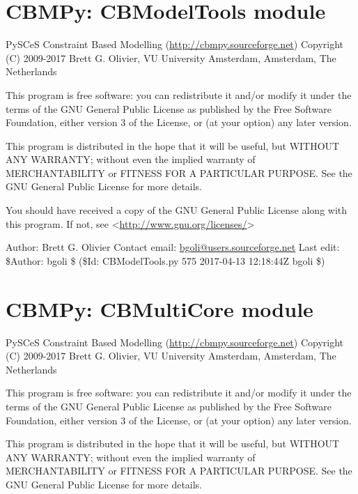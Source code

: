 \documentclass[a4paper,11pt,english]{sphinxmanual}
\begin{document}
\label{modules_doc:module-cbmpy.CBModelTools}

\section{CBMPy: CBModelTools module}
\label{modules_doc:cbmpy-cbmodeltools-module}
PySCeS Constraint Based Modelling (\url{http://cbmpy.sourceforge.net})
Copyright (C) 2009-2017 Brett G. Olivier, VU University Amsterdam, Amsterdam, The Netherlands

This program is free software: you can redistribute it and/or modify
it under the terms of the GNU General Public License as published by
the Free Software Foundation, either version 3 of the License, or
(at your option) any later version.

This program is distributed in the hope that it will be useful,
but WITHOUT ANY WARRANTY; without even the implied warranty of
MERCHANTABILITY or FITNESS FOR A PARTICULAR PURPOSE.  See the
GNU General Public License for more details.

You should have received a copy of the GNU General Public License
along with this program.  If not, see \textless{}\url{http://www.gnu.org/licenses/}\textgreater{}

Author: Brett G. Olivier
Contact email: \href{mailto:bgoli@users.sourceforge.net}{bgoli@users.sourceforge.net}
Last edit: \$Author: bgoli \$ (\$Id: CBModelTools.py 575 2017-04-13 12:18:44Z bgoli \$)
\label{modules_doc:module-cbmpy.CBMultiCore}

\section{CBMPy: CBMultiCore module}
\label{modules_doc:cbmpy-cbmulticore-module}
PySCeS Constraint Based Modelling (\url{http://cbmpy.sourceforge.net})
Copyright (C) 2009-2017 Brett G. Olivier, VU University Amsterdam, Amsterdam, The Netherlands

This program is free software: you can redistribute it and/or modify
it under the terms of the GNU General Public License as published by
the Free Software Foundation, either version 3 of the License, or
(at your option) any later version.

This program is distributed in the hope that it will be useful,
but WITHOUT ANY WARRANTY; without even the implied warranty of
MERCHANTABILITY or FITNESS FOR A PARTICULAR PURPOSE.  See the
GNU General Public License for more details.
\end{document}
